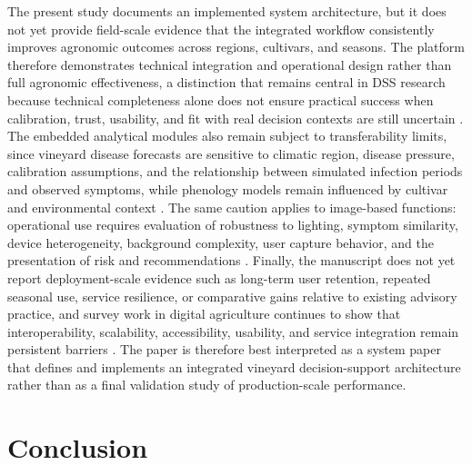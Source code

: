 \documentclass[11pt,a4paper]{article}
\begin{document}
The present study documents an implemented system architecture, but it does not yet provide field-scale evidence that the integrated workflow consistently improves agronomic outcomes across regions, cultivars, and seasons. The platform therefore demonstrates technical integration and operational design rather than full agronomic effectiveness, a distinction that remains central in DSS research because technical completeness alone does not ensure practical success when calibration, trust, usability, and fit with real decision contexts are still uncertain \citep{McCown2002DSSComplexity,Rose2018UserCentredDSS,Knowling2021ViticultureModels}. The embedded analytical modules also remain subject to transferability limits, since vineyard disease forecasts are sensitive to climatic region, disease pressure, calibration assumptions, and the relationship between simulated infection periods and observed symptoms, while phenology models remain influenced by cultivar and environmental context \citep{Puelles2024DownyMildewModels,Caffarra2014PhenologyComparison,Molitor2020UniPhen}. The same caution applies to image-based functions: operational use requires evaluation of robustness to lighting, symptom similarity, device heterogeneity, background complexity, user capture behavior, and the presentation of risk and recommendations \citep{Kunduracioglu2024GrapeDeepLearning,Portela2024GrapevineSensingReview}. Finally, the manuscript does not yet report deployment-scale evidence such as long-term user retention, repeated seasonal use, service resilience, or comparative gains relative to existing advisory practice, and survey work in digital agriculture continues to show that interoperability, scalability, accessibility, usability, and service integration remain persistent barriers \citep{Zhai2020Agriculture40DSS,Tummers2021ReferenceArchitecture}. The paper is therefore best interpreted as a system paper that defines and implements an integrated vineyard decision-support architecture rather than as a final validation study of production-scale performance.

\section{Conclusion}
\end{document}
